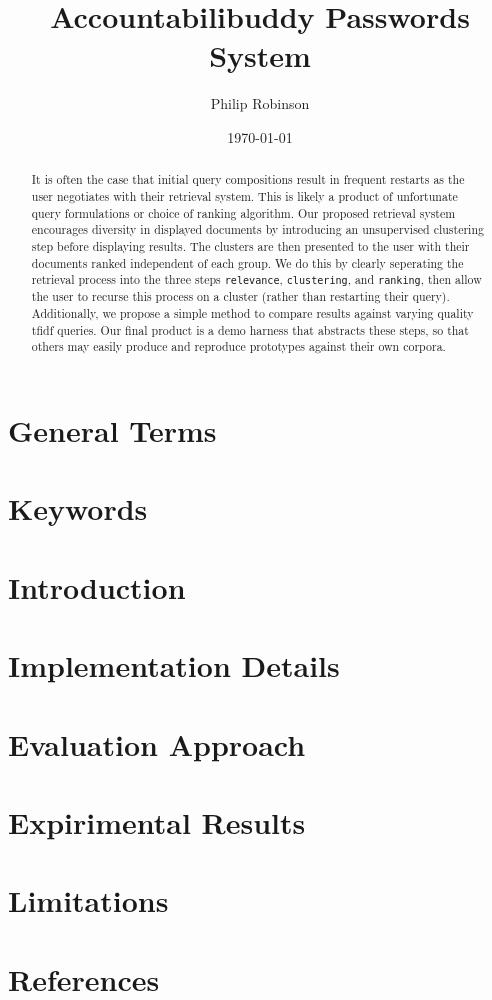\documentclass[11pt]{article} %
\title{Accountabilibuddy Passwords System}
\date{\today}
\author{Philip Robinson}
\begin{document}
\maketitle
{}
\begin{abstract}
  It is often the case that initial query compositions result in frequent restarts as
  the user negotiates with their retrieval system. This is likely a product of unfortunate
  query formulations or choice of ranking algorithm. Our proposed retrieval system
  encourages diversity in displayed documents by introducing an unsupervised clustering
  step before displaying results. The clusters are then presented to the user with their
  documents ranked independent of each group. We do this by clearly seperating the
  retrieval process into the three steps \texttt{relevance}, \texttt{clustering}, and
  \texttt{ranking}, then allow the user to recurse this process on a cluster (rather
  than restarting their query). Additionally, we propose a simple method to
  compare results against varying quality tfidf queries. Our final product is a demo
  harness that abstracts these steps, so that others may easily produce and reproduce
  prototypes against their own corpora.
\end{abstract}
\section*{General Terms}
\section*{Keywords}
\section*{Introduction}
\section*{Implementation Details}
\section*{Evaluation Approach}
\section*{Expirimental Results}
\section*{Limitations}
\section*{References}
\end{document}
